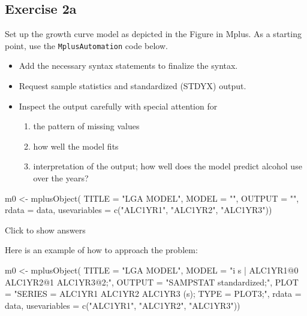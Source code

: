 \documentclass[
]{book}
\newenvironment{Shaded}{\begin{snugshade}}{\end{snugshade}}
\newcommand{\AttributeTok}[1]{\textcolor[rgb]{0.77,0.63,0.00}{#1}}
\newcommand{\FunctionTok}[1]{\textcolor[rgb]{0.00,0.00,0.00}{#1}}
\newcommand{\NormalTok}[1]{#1}
\newcommand{\OtherTok}[1]{\textcolor[rgb]{0.56,0.35,0.01}{#1}}
\newcommand{\StringTok}[1]{\textcolor[rgb]{0.31,0.60,0.02}{#1}}
\providecommand{\tightlist}{%
  \setlength{\itemsep}{0pt}\setlength{\parskip}{0pt}}
\begin{document}
\hypertarget{exercise-2a}{%
\subsection{Exercise 2a}\label{exercise-2a}}

Set up the growth curve model as depicted in the Figure in Mplus.
As a starting point, use the \texttt{MplusAutomation} code below.

\begin{itemize}
\tightlist
\item
  Add the necessary syntax statements to finalize the syntax.
\item
  Request sample statistics and standardized (STDYX) output.
\item
  Inspect the output carefully with special attention for

  \begin{enumerate}
  \def\labelenumi{\arabic{enumi}.}
  \tightlist
  \item
    the pattern of missing values
  \item
    how well the model fits
  \item
    interpretation of the output; how well does the model predict alcohol use over the
    years?
  \end{enumerate}
\end{itemize}

\begin{Shaded}
\begin{Highlighting}[]
\NormalTok{m0 }\OtherTok{\textless{}{-}} \FunctionTok{mplusObject}\NormalTok{(}
  \AttributeTok{TITLE =} \StringTok{"LGA MODEL"}\NormalTok{,}
  \AttributeTok{MODEL =} \StringTok{""}\NormalTok{,}
  \AttributeTok{OUTPUT =} \StringTok{""}\NormalTok{,}
  \AttributeTok{rdata =}\NormalTok{ data,}
  \AttributeTok{usevariables =} \FunctionTok{c}\NormalTok{(}\StringTok{"ALC1YR1"}\NormalTok{, }\StringTok{"ALC1YR2"}\NormalTok{, }\StringTok{"ALC1YR3"}\NormalTok{))}
\end{Highlighting}
\end{Shaded}

Click to show answers

Here is an example of how to approach the problem:

\begin{Shaded}
\begin{Highlighting}[]
\NormalTok{m0 }\OtherTok{\textless{}{-}} \FunctionTok{mplusObject}\NormalTok{(}
  \AttributeTok{TITLE =} \StringTok{"LGA MODEL"}\NormalTok{,}
  \AttributeTok{MODEL =} \StringTok{"i s | ALC1YR1@0 ALC1YR2@1 ALC1YR3@2;"}\NormalTok{,}
  \AttributeTok{OUTPUT =} \StringTok{"SAMPSTAT standardized;"}\NormalTok{,}
  \AttributeTok{PLOT =} \StringTok{"SERIES = ALC1YR1 ALC1YR2 ALC1YR3 (s);}
\StringTok{            TYPE = PLOT3;"}\NormalTok{,}
  \AttributeTok{rdata =}\NormalTok{ data,}
  \AttributeTok{usevariables =} \FunctionTok{c}\NormalTok{(}\StringTok{"ALC1YR1"}\NormalTok{, }\StringTok{"ALC1YR2"}\NormalTok{, }\StringTok{"ALC1YR3"}\NormalTok{))}
\end{Highlighting}
\end{Shaded}
\end{document}
